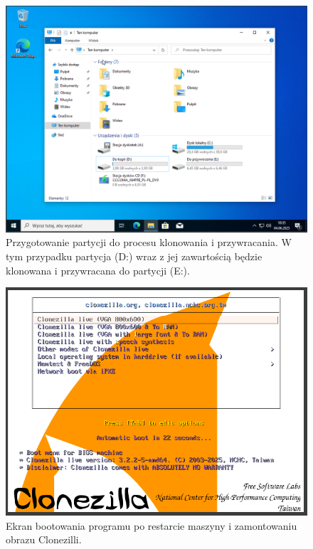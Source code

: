 \documentclass[0.82pt,a4paper]{article}
\begin{document}
    \begin{figure}[H]
        \centering
        \includegraphics[width=0.8\linewidth]{media/Clonezilla/clone1.PNG}
        \caption[clone 1]{Przygotowanie partycji do procesu klonowania i przywracania. W tym przypadku partycja (D:) wraz z jej zawartością będzie klonowana i przywracana do partycji (E:).}
        \label{fig:clone1}
    \end{figure}
    
    \begin{figure}[H]
        \centering
        \includegraphics[width=0.8\linewidth]{media/Clonezilla/clone2.PNG}
        \caption[clone glowne]{Ekran bootowania programu po restarcie maszyny i zamontowaniu obrazu Clonezilli.}
        \label{fig:clone2}
    \end{figure}
    
\end{document}
